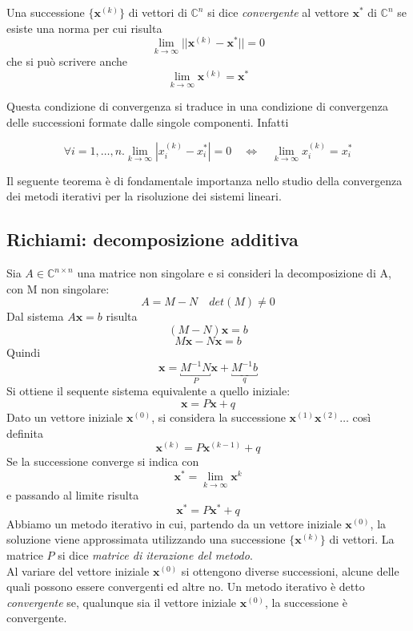 \begin{defn}[Convergenza]
Una successione $\{\mathbf{x}^{(k)}\}$ di vettori di $\mathbb{C}^n$ si dice
\emph{convergente} al vettore $\mathbf{x}^{*}$ di $\mathbb{C}^n$ se esiste una
norma per cui risulta
$$ \lim_{k \to \infty} || \mathbf{x}^{(k)} - \mathbf{x}^{*} || = 0 $$
che si può scrivere anche
$$ \lim_{k \to \infty} \mathbf{x}^{(k)} = \mathbf{x}^{*} $$
\end{defn}
Questa condizione di convergenza si traduce in una condizione di
convergenza delle successioni formate dalle singole componenti. Infatti

$$ \forall i = 1, \ldots, n . 
\lim_{k \to \infty} | x^{(k)}_i - x^{*}_i | = 0 
\quad \Longleftrightarrow \quad 
\lim_{k \to \infty} x^{(k)}_{i} = x^{*}_{i} $$

Il seguente teorema \`e di fondamentale importanza nello studio della
convergenza dei metodi iterativi per la risoluzione dei sistemi lineari.



\subsection{Richiami: decomposizione additiva}
Sia $A \in \mathbb{C}^{n \times n}$ una matrice non singolare e si
consideri la decomposizione di A, con M non singolare:
$$ A = M - N \quad det(M) \neq 0 $$
Dal sistema $A\mathbf{x}=b$ risulta 
$$ (M-N)\mathbf{x} = b$$
$$ M\mathbf{x} - N\mathbf{x} =b$$
Quindi 
$$\mathbf{x} = \underbracket{M^{-1}N}_{P} \mathbf{x} + \underbracket{M^{-1} b}_{q} $$
Si ottiene il sequente sistema equivalente a quello iniziale:
$$ \mathbf{x} = P\mathbf{x} + q $$
Dato un vettore iniziale $\mathbf{x}^{(0)}$, si considera la successione
$\mathbf{x}^{(1)} \mathbf{x}^{(2)} \ldots$ così definita
$$ \mathbf{x}^{(k)} = P\mathbf{x}^{(k-1)} + q$$
Se la successione converge si indica con 
$$ \mathbf{x}^{*} = \lim_{k \to \infty} \mathbf{x}^{k} $$
e passando al limite risulta
$$ \mathbf{x}^{*} = P\mathbf{x}^{*} + q $$
Abbiamo un metodo iterativo in cui, partendo da un vettore iniziale
$\mathbf{x}^{(0)}$, la soluzione viene approssimata utilizzando una successione
$\{\mathbf{x}^{(k)}\}$ di vettori. La matrice $P$ si dice \emph{matrice di
iterazione del metodo}.\\
Al variare del vettore iniziale $\mathbf{x}^{(0)}$ si ottengono diverse
successioni, alcune delle quali possono essere convergenti ed altre
no. Un metodo iterativo \`e detto \emph{convergente} se, qualunque sia
il vettore iniziale $\mathbf{x}^{(0)}$, la successione \`e convergente.

